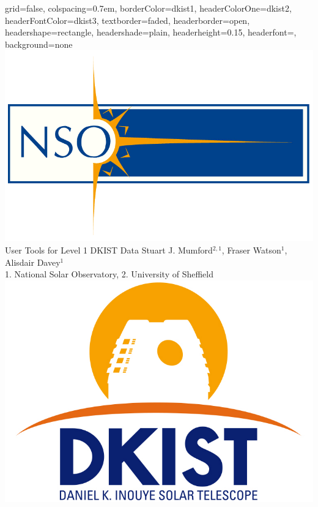 \documentclass[a0paper,landscape,fontscale=0.3]{baposter}
\begin{document}
\begin{poster}{
 grid=false,
 colspacing=0.7em,
 borderColor=dkist1,
 headerColorOne=dkist2,
 headerFontColor=dkist3,
 textborder=faded,
 headerborder=open,
 headershape=rectangle,
 headershade=plain,
 headerheight=0.15\textheight,
 headerfont={\bf\large},
 background=none
 }
 {
   \includegraphics[height=0.08\textheight]{NSOlogo_transparent.png}
 }
 {\sc\Huge User Tools for Level 1 DKIST Data}
 {Stuart J. Mumford$^{2,1}$, Fraser Watson$^{1}$, Alisdair Davey$^{1}$\\
 {\footnotesize{1. National Solar Observatory, 2. University of Sheffield}}}
 {
 \includegraphics[height=0.08\textheight]{dkistlogo.jpg}
 }
 


\end{poster}
\end{document}
